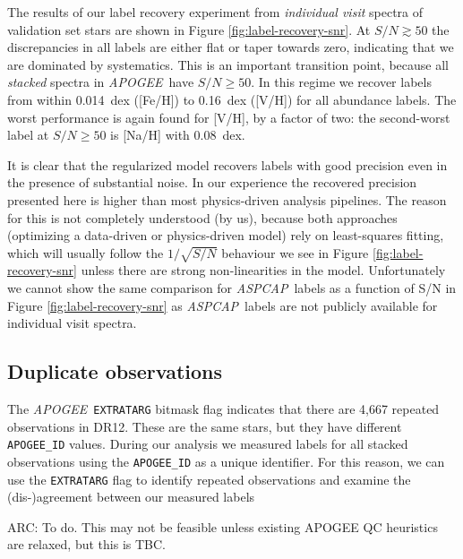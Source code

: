 \documentclass[12pt,preprint]{aastex}
\newcommand{\project}[1]{\textsl{#1}}
\newcommand{\acronym}[1]{{\small{#1}}}
\newcommand{\apogee}{\project{\acronym{APOGEE}}}
\newcommand{\aspcap}{\project{\acronym{ASPCAP}}}
\newcommand{\dr}{\acronym{DR12}}
\begin{document}
The results of our label recovery experiment from \emph{individual visit} spectra of
validation set stars are shown in Figure \ref{fig:label-recovery-snr}.  
At $S/N \gtrsim 50$ the discrepancies in all
labels are either flat or taper towards zero, indicating that we are dominated
by systematics.  This is an important transition point, because all 
\emph{stacked} spectra in \apogee\ have $S/N \geq 50$.  In this regime we 
recover labels from within 0.014~dex ([Fe/H]) to 0.16~dex ([V/H]) for all 
abundance labels.  The worst performance is again found for [V/H], by a factor of
two: the second-worst label at $S/N \geq 50$ is [Na/H] with 0.08~dex. 


It is clear that the regularized model recovers labels with good precision even
in the presence of substantial noise.  In our experience the recovered 
precision presented here is higher than most physics-driven analysis pipelines.  
The reason for this is not completely understood (by us), because both approaches 
(optimizing a data-driven or physics-driven model) rely on least-squares 
fitting, which will usually follow the $1/\sqrt{S/N}$ behaviour we see in Figure 
\ref{fig:label-recovery-snr} unless there are strong non-linearities in the model.
Unfortunately we cannot show the same comparison for \aspcap\ labels as a 
function of S/N in Figure \ref{fig:label-recovery-snr} as \aspcap\ labels are not
publicly available for individual visit spectra.


\subsection{Duplicate observations}
\label{sec:duplicate-observations}


The \apogee\ \texttt{EXTRATARG} bitmask flag indicates that there are 4,667
repeated observations in \dr.  These are the same stars, but they have different
\texttt{APOGEE\_ID} values.  During our analysis we measured labels for all
stacked observations using the \texttt{APOGEE\_ID} as a unique identifier.  For
this reason, we can use the \texttt{EXTRATARG} flag to identify repeated
observations and examine the (dis-)agreement between our measured labels

ARC: To do. This may not be feasible unless existing APOGEE QC heuristics are relaxed, but this is TBC.


\end{document}

